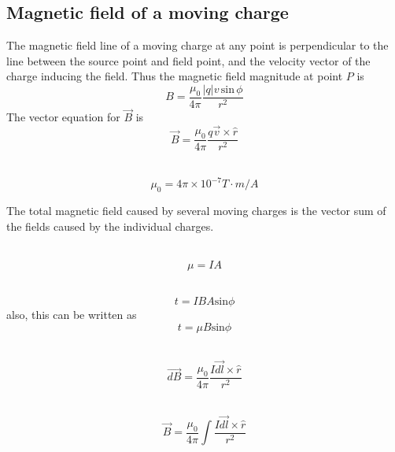 \documentclass[nobib,notoc]{tufte-handout}
\begin{document}
\subsection{Magnetic field of a moving charge}
The magnetic field line of a moving charge at any point is perpendicular to the line between the source point and field point, and the velocity vector of the charge inducing the field. Thus the magnetic field magnitude at point \(P\) is
\begin{equation*}
	B=\frac{\mu_0}{4\pi}\frac{\lvert q\rvert v\,\text{sin}\,\phi}{r^2}
\end{equation*}
The vector equation for \(\vec{B}\) is
\begin{equation*}
	\vec{B}=\frac{\mu_0}{4\pi}\frac{q\vec{v}\times\hat{r}}{r^2}
\end{equation*}
\begin{defi}
	\,
	\begin{equation*}
		\mu_0=4\pi\times 10^{-7}T\cdot m/A
	\end{equation*}
\end{defi}
\begin{defi}
	The total magnetic field caused by several moving charges is the vector sum of the fields caused by the individual charges.
\end{defi}
\begin{defi}
	\,
	\begin{equation*}
		\mu=IA
	\end{equation*}
\end{defi}
\begin{defi}
	\,
	\begin{equation*}
		t=IBA\text{sin}\phi
	\end{equation*}
	also, this can be written as
	\begin{equation*}
		t=\mu B\text{sin}\phi
	\end{equation*}
\end{defi}
\begin{defi}
	\,
	\begin{equation*}
		\vec{dB}=\frac{\mu_0}{4\pi}\frac{I\vec{dl}\times\hat{r}}{r^2}
	\end{equation*}
\end{defi}
\begin{defi}
	\,
	\begin{equation*}
		\vec{B}=\frac{\mu_0}{4\pi}\int\frac{I\vec{dl}\times\hat{r}}{r^2}
	\end{equation*}
\end{defi}
\end{document}

